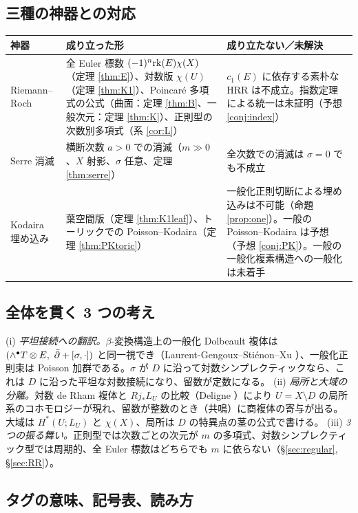 \subsection{三種の神器との対応}
\begin{center}\small
\begin{tabular}{>{\raggedright\arraybackslash}p{2.4cm}>{\raggedright\arraybackslash}p{6.5cm}>{\raggedright\arraybackslash}p{6.0cm}}
\toprule 神器 & 成り立った形 & 成り立たない／未解決\\\midrule
Riemann--Roch & 全 Euler 標数 $(-1)^n\mathrm{rk}(E)\chi(X)$（定理 \ref{thm:E}）、対数版 $\chi(U)$（定理 \ref{thm:K1}）、Poincar\'e 多項式の公式（曲面：定理 \ref{thm:B}、一般次元：定理 \ref{thm:K}）、正則型の次数別多項式（系 \ref{cor:L}） & $c_1(E)$ に依存する素朴な HRR は不成立。指数定理による統一は未証明（予想 \ref{conj:index}）\\\midrule
Serre 消滅 & 横断次数 $a>0$ での消滅（$m\gg0$、$X$ 射影、$\sigma$ 任意、定理 \ref{thm:serre}） & 全次数での消滅は $\sigma=0$ でも不成立\\\midrule
Kodaira 埋め込み & 葉空間版（定理 \ref{thm:K1leaf}）、トーリックでの Poisson--Kodaira（定理 \ref{thm:PKtoric}） & 一般化正則切断による埋め込みは不可能（命題 \ref{prop:one}）。一般の Poisson--Kodaira は予想（予想 \ref{conj:PK}）。一般の一般化複素構造への一般化は未着手\\\bottomrule
\end{tabular}
\end{center}

\subsection{全体を貫く 3 つの考え}
(i) \emph{平坦接続への翻訳。}$\beta$-変換構造上の一般化 Dolbeault 複体は $(\wedge^\bullet T\otimes E,\ \dbar+[\sigma,\cdot])$ と同一視でき\tC（Laurent-Gengoux--Sti\'enon--Xu \cite{LGSX1}）、一般化正則束は Poisson 加群である。$\sigma$ が $D$ に沿って対数シンプレクティックなら、これは $D$ に沿った平坦な対数接続になり、留数が定数になる。
(ii) \emph{局所と大域の分離。}対数 de Rham 複体と $Rj_*L_U$ の比較（Deligne \cite{Del}）により $U=X\setminus D$ の局所系のコホモロジーが現れ、留数が整数のとき（共鳴）に商複体の寄与が出る。大域は $H^*(U;L_U)$ と $\chi(X)$、局所は $D$ の特異点の茎の公式で書ける。
(iii) \emph{3 つの振る舞い。}正則型では次数ごとの次元が $m$ の多項式、対数シンプレクティック型では周期的、全 Euler 標数はどちらでも $m$ に依らない（\S\ref{sec:regular}, \S\ref{sec:RR}）。

\subsection{タグの意味、記号表、読み方}\label{subsec:tags}
